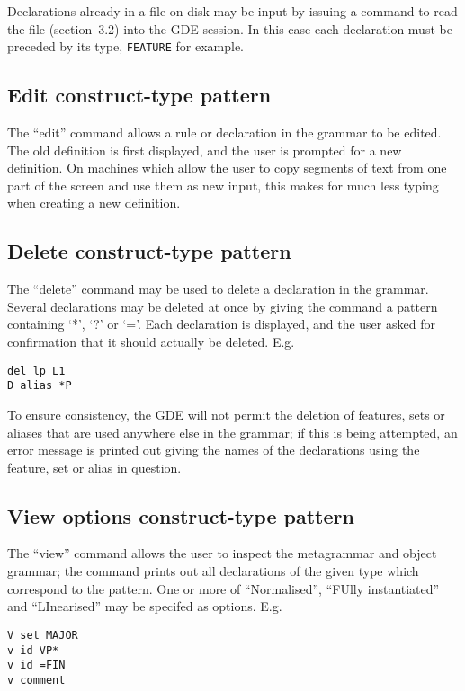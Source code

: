 Declarations already in a file on disk may be input by issuing a command
to read the file (section~3.2) into the GDE session.  In this case each
declaration must be preceded by its type, {\tt FEATURE} for example.

\subsection{Edit construct-type pattern}

The ``edit'' command allows a rule or declaration in the grammar to be
edited. The old definition is first displayed, and the user is prompted
for a new definition. On machines which allow the user to copy segments
of text from one part of the screen and use them as new input, this makes
for much less typing when creating a new definition.

\subsection{Delete construct-type pattern}

The ``delete'' command may be used to delete a declaration in the
grammar.  Several declarations may be deleted at once by giving the
command a pattern containing `*', `?' or `='. Each declaration is
displayed, and the user asked for confirmation that it should actually
be deleted. E.g.
\begin{ex}
\begin{verbatim}
del lp L1
D alias *P
\end{verbatim}
\end{ex}
To ensure consistency, the GDE will not permit the deletion of features,
sets or aliases that are used anywhere else in the grammar; if this is
being attempted, an error message is printed out giving the names of the
declarations using the feature, set or alias in question.

\subsection{View options construct-type pattern}

The ``view'' command allows the user to inspect the metagrammar and
object grammar; the command prints out all declarations of the given
type which correspond to the pattern. One or more of ``Normalised'',
``FUlly instantiated'' and ``LInearised'' may be specifed as options.
E.g.
\begin{ex}
\begin{verbatim}
V set MAJOR
v id VP*
v id =FIN
v comment
\end{verbatim}
\end{ex}

